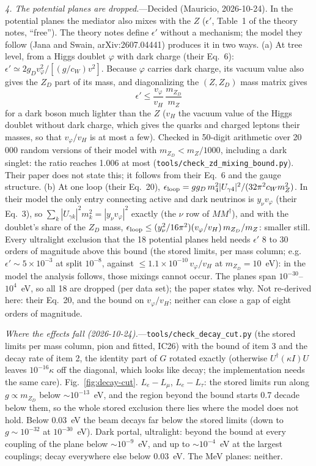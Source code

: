\documentclass[11pt,a4paper]{article}
\newcommand{\file}[1]{\nolinkurl{#1}}
\newcommand{\mzd}{m_{Z_D}}
\newcommand{\gd}{g_D}
\newcommand{\epsp}{\epsilon'}
\begin{document}
\textit{4. The potential planes are dropped.}---Decided (Mauricio, 2026-10-24). In the potential planes the mediator
also mixes with the $Z$ ($\epsp$, Table~1 of the theory notes, ``free''). The theory notes define $\epsp$ without a
mechanism; the model they follow (Jana and Swain, arXiv:2607.04441) produces it in two ways. (a) At tree level, from
a Higgs doublet $\varphi$ with dark charge (their Eq.~6): $\epsp \simeq 2\gd v_\varphi^2/[(g/c_W)v^2]$. Because
$\varphi$ carries dark charge, its vacuum value also gives the $Z_D$ part of its mass, and diagonalizing the
$(Z, Z_D)$ mass matrix gives
\begin{equation}
  \epsp \le \frac{v_\varphi}{v_H}\,\frac{\mzd}{m_Z}
\end{equation}
for a dark boson much lighter than the $Z$ ($v_H$ the vacuum value of the Higgs doublet without dark charge, which
gives the quarks and charged leptons their masses, so that $v_\varphi/v_H$ is at most a few). Checked in 50-digit
arithmetic over 20\,000 random versions of their model with $\mzd < m_Z/1000$, including a dark singlet: the ratio
reaches 1.006 at most (\file{tools/check\_zd\_mixing\_bound.py}). Their paper does not state this; it follows from
their Eq.~6 and the gauge structure. (b) At one loop (their Eq.~20), $\epsilon_{\rm loop} =
g\gd\,m_4^2|U_{\gamma4}|^2/(32\pi^2 c_W m_Z^2)$. In their model the only entry connecting active and dark neutrinos is
$y_\nu v_\varphi$ (their Eq.~3), so $\sum_k |U_{\gamma k}|^2 m_k^2 = |y_\nu v_\varphi|^2$ exactly (the $\nu$ row of
$MM^\dagger$), and with the doublet's share of the $Z_D$ mass,
$\epsilon_{\rm loop} \le (y_\nu^2/16\pi^2)(v_\varphi/v_H)\,\mzd/m_Z$: smaller still. Every ultralight exclusion that
the 18 potential planes held needs $\epsp$ 8 to 30 orders of magnitude above this bound (the stored limits, per mass
column; e.g.\ $\epsp \sim 5\times10^{-3}$ at split $10^{-8}$, against $\le 1.1\times10^{-10}\,v_\varphi/v_H$ at $\mzd = 10$~eV): in the model
the analysis follows, those mixings cannot occur. The planes span $10^{-30}$--$10^{4}$~eV, so all 18 are dropped
(per data set); the paper states why. Not re-derived here: their Eq.~20, and the bound on $v_\varphi/v_H$; neither can
close a gap of eight orders of magnitude.

\textit{Where the effects fall (2026-10-24).}---\file{tools/check\_decay\_cut.py} (the stored limits per mass column,
pion and fitted, IC26) with the bound of item 3 and the decay rate of item 2, the identity part of $G$ rotated
exactly (otherwise $U^\dagger(\kappa I)U$ leaves $10^{-16}\kappa$ off the diagonal, which looks like decay; the
implementation needs the same care). Fig.~\ref{fig:decay-cut}. $L_e - L_\mu$, $L_e - L_\tau$: the stored limits run
along $g \propto \mzd$ below $\sim10^{-13}$~eV, and the region beyond the bound starts 0.7 decade below them, so the
whole stored exclusion there lies where the model does not hold. Below 0.03~eV the beam decays far below the stored
limits (down to $g\sim10^{-32}$ at $10^{-30}$~eV). Dark portal, ultralight: beyond the bound at every coupling of the
plane below $\sim10^{-9}$~eV, and up to $\sim10^{-4}$~eV at the largest couplings; decay everywhere else below
0.03~eV. The MeV planes: neither.
\end{document}

